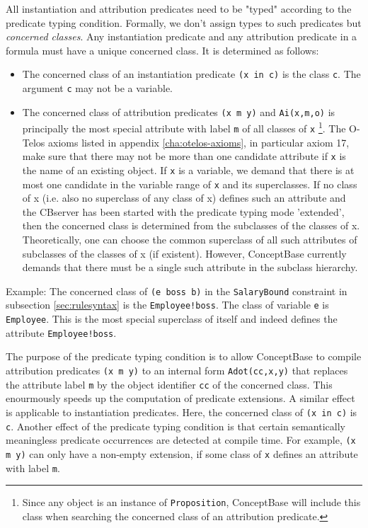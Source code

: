 All instantiation and attribution predicates need to be "typed" according
to the predicate typing condition.
Formally, we don't assign types to such predicates but 
{\em concerned classes}. Any instantiation predicate and any attribution
predicate in a formula must have a unique concerned class. It is determined as follows:

\begin{itemize}
\item The concerned class of an instantiation predicate {\tt (x in c)} is the class {\tt c}.
The argument {\tt c} may not be a variable.
\item The concerned class of attribution predicates {\tt (x m y)} and {\tt Ai(x,m,o)} is principally the most 
special attribute with label {\tt m} of all classes of {\tt x}%
\footnote{Since any object is an instance of {\tt Proposition}, ConceptBase will include this class
when searching the concerned class of an attribution predicate.}.
The O-Telos axioms listed in
appendix \ref{cha:otelos-axioms}, in particular axiom 17, make sure that there may 
not be more than one
candidate attribute if {\tt x} is the name of an existing object. If {\tt x}
is a variable, we demand that there is at most one candidate in the variable range of {\tt x}
and its superclasses.
If no class of x (i.e. also no superclass of any class of x) defines such an attribute
and the CBserver has been started with the predicate typing mode 'extended', then
the concerned class is determined from the subclasses of the classes of x. Theoretically,
one can choose the common superclass of all such attributes of subclasses of the classes of x (if existent).
However, ConceptBase currently demands that there must be a single such attribute in the 
subclass hierarchy. 
\end{itemize}


Example: The concerned class of {\tt (e boss b)}  in the {\tt SalaryBound} constraint in subsection
\ref{sec:rulesyntax} is the {\tt Employee!boss}. The class of variable {\tt e} is {\tt Employee}. This
is the most special superclass of itself and indeed defines the attribute {\tt Employee!boss}.

The purpose of the predicate typing condition is to allow ConceptBase to compile
attribution predicates {\tt (x m y)} to an internal form {\tt Adot(cc,x,y)} that
replaces the attribute label {\tt m} by the object identifier {\tt cc} of the concerned class. 
This enourmously speeds up the computation of predicate extensions. 
A similar effect is applicable to instantiation predicates. Here, the
concerned class of {\tt (x in c)}  is {\tt c}. Another effect of the
predicate typing condition is that certain semantically meaningless 
predicate occurrences are detected at compile time. For example,
{\tt (x m y)} can only have a non-empty extension, if some class of
{\tt x} defines an attribute with label {\tt m}. 

